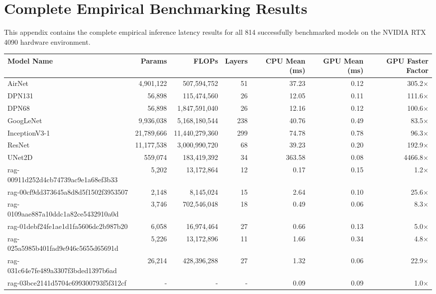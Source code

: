\appendix
\section{Complete Empirical Benchmarking Results}
This appendix contains the complete empirical inference latency results for all 814 successfully benchmarked models on the NVIDIA RTX 4090 hardware environment. \\ \vspace{1cm}

\begin{table}[h!]
\centering
\fontsize{7}{9}\selectfont
\begin{tabular}{lrrrrrr}
\toprule
\textbf{Model Name} & \textbf{Params} & \textbf{FLOPs} & \textbf{Layers} & \textbf{CPU Mean (ms)} & \textbf{GPU Mean (ms)} & \textbf{GPU Faster Factor} \\
\midrule
AirNet & 4,901,122 & 507,594,752 & 51 & 37.23 & 0.12 & 305.2$\times$ \\
DPN131 & 56,898 & 115,474,560 & 26 & 12.05 & 0.11 & 111.6$\times$ \\
DPN68 & 56,898 & 1,847,591,040 & 26 & 12.16 & 0.12 & 100.6$\times$ \\
GoogLeNet & 9,936,038 & 5,168,180,544 & 238 & 40.76 & 0.49 & 83.5$\times$ \\
InceptionV3-1 & 21,789,666 & 11,440,279,360 & 299 & 74.78 & 0.78 & 96.3$\times$ \\
ResNet & 11,177,538 & 3,000,990,720 & 68 & 39.23 & 0.20 & 192.9$\times$ \\
UNet2D & 559,074 & 183,419,392 & 34 & 363.58 & 0.08 & 4466.8$\times$ \\
rag-00911d252d4cb74739ac9e1a68ef3b33 & 5,202 & 13,172,864 & 12 & 0.17 & 0.15 & 1.2$\times$ \\
rag-00cf9dd373645a8d8d5f1502f3953507 & 2,148 & 8,145,024 & 15 & 2.64 & 0.10 & 25.6$\times$ \\
rag-0109aae887a10ddc1a82ce5432910a0d & 3,746 & 702,546,048 & 18 & 0.49 & 0.06 & 8.3$\times$ \\
rag-01debf24fe1ae1d1fa5606dc2b987b20 & 6,058 & 16,974,464 & 27 & 0.66 & 0.13 & 5.0$\times$ \\
rag-025a5985b401fad9e946c5655d65691d & 5,226 & 13,172,896 & 11 & 1.66 & 0.34 & 4.8$\times$ \\
rag-031c64e7fe489a3307f3bded1397b6ad & 26,214 & 428,396,288 & 27 & 1.32 & 0.06 & 22.9$\times$ \\
rag-03bce2141d5704c699300793f5f312cf & - & - & - & 0.09 & 0.09 & 1.0$\times$ \\

\end{tabular}
\end{table}
